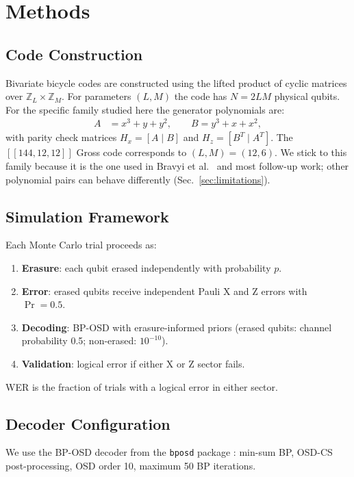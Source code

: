 \documentclass[a4paper]{quantumarticle}
\begin{document}
\section{Methods}

\subsection{Code Construction}

Bivariate bicycle codes are constructed using the lifted product of cyclic matrices over
$\mathbb{Z}_L \times \mathbb{Z}_M$.
For parameters $(L, M)$ the code has $N = 2LM$ physical qubits.
For the specific family studied here the generator polynomials are:
\begin{align}
A &= x^3 + y + y^2, \qquad B = y^3 + x + x^2,
\end{align}
with parity check matrices $H_x = [A \mid B]$ and $H_z = [B^T \mid A^T]$.
The $[[144,12,12]]$ Gross code corresponds to $(L,M) = (12,6)$.
We stick to this family because it is the one used in Bravyi et al.\ \cite{bravyi2024high}
and most follow-up work; other polynomial pairs can behave differently
(Sec.~\ref{sec:limitations}).

\subsection{Simulation Framework}

Each Monte Carlo trial proceeds as:
\begin{enumerate}
    \item \textbf{Erasure}: each qubit erased independently with probability $p$.
    \item \textbf{Error}: erased qubits receive independent Pauli X and Z errors with $\Pr=0.5$.
    \item \textbf{Decoding}: BP-OSD with erasure-informed priors (erased qubits: channel
          probability 0.5; non-erased: $10^{-10}$).
    \item \textbf{Validation}: logical error if either X or Z sector fails.
\end{enumerate}
WER is the fraction of trials with a logical error in either sector.

\subsection{Decoder Configuration}

We use the BP-OSD decoder from the \texttt{bposd} package \cite{roffe2020decoding}:
min-sum BP, OSD-CS post-processing, OSD order 10, maximum 50 BP iterations.
\end{document}
